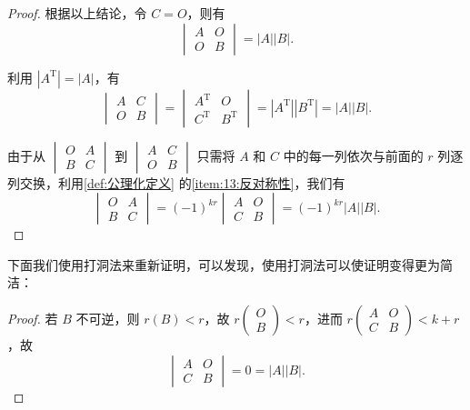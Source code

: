 \begin{enumerate}
\begin{proof}
            根据以上结论，令 $C = O$，则有
            \[
                \begin{vmatrix} A & O \\ O & B \end{vmatrix} = |A||B|.
            \]

            利用 $|A^\mathrm{T}|=|A|$，有
            \[
                \begin{vmatrix}
                    A & C \\ O & B
                \end{vmatrix} = \begin{vmatrix}
                    A^\mathrm{T} & O \\ C^\mathrm{T} & B^\mathrm{T}
                \end{vmatrix} = |A^\mathrm{T}||B^\mathrm{T}| = |A||B|.
            \]

            由于从 $\begin{vmatrix} O & A \\ B & C \end{vmatrix}$ 到 $\begin{vmatrix} A & C \\ O & B \end{vmatrix}$ 只需将 $A$ 和 $C$ 中的每一列依次与前面的 $r$ 列逐列交换，利用\autoref{def:公理化定义} 的\ref*{item:13:反对称性}，我们有
            \[
                \begin{vmatrix}
                    O & A \\ B & C
                \end{vmatrix} = (-1)^{kr} \begin{vmatrix}
                    A & O \\ C & B
                \end{vmatrix} = (-1)^{kr} |A||B|.
            \]
          \end{proof}

          下面我们使用打洞法来重新证明，可以发现，使用打洞法可以使证明变得更为简洁：
          \begin{proof}
              若 $B$ 不可逆，则 $r(B) < r$，故 $r\begin{pmatrix} O \\ B \end{pmatrix} < r$，进而 $r\begin{pmatrix} A & O \\ C & B \end{pmatrix} < k + r$，故
              \[
                  \begin{vmatrix}
                      A & O \\ C & B
                  \end{vmatrix} = 0 = |A||B|.
              \]


\end{proof}
\end{enumerate}
